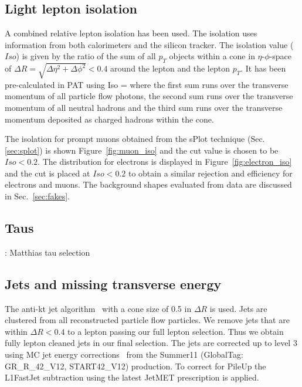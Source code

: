 \subsection{Light lepton isolation}\label{sec:isolation}

A combined relative lepton isolation has been used. The isolation uses information from both calorimeters and the silicon tracker. The isolation value ($Iso$) is given by the ratio of the sum of all $p_T$ objects within a cone in $\eta$-$\phi$-space of $\Delta R = \sqrt{\Delta \eta^2 + \Delta \phi^2 } < 0.4$ around the lepton and the lepton $p_T$. It has been pre-calculated in PAT using
\be
    Iso = 
\ee
where the first sum runs over the transverse momentum of all particle flow photons, the second sum runs over the transverse momentum of all neutral hadrons and the third sum runs over the transverse momentum deposited as charged hadrons within the cone.


The isolation for prompt muons obtained from the sPlot technique (Sec.\ref{sec:splot}) is shown Figure~\ref{fig:muon_iso} and the cut value is chosen to be $Iso<0.2$. The distribution for electrons is displayed in Figure~\ref{fig:electron_iso} and the cut is placed at $Iso<0.2$ to obtain a similar rejection and efficiency for electrons and muons. The background shapes evaluated from data are discussed in Sec.~\ref{sec:fakes}.

\subsection{Taus}\label{sec:taus}

\TODO: Matthias tau selection

\subsection{Jets and missing transverse energy}\label{sec:jet}

The anti-kt jet algorithm~\cite{antiKT} with a cone size of 0.5 in $\Delta R$ is used. 
Jets are clustered from all reconstructed particle flow particles.
We remove jets that are within $\Delta R < 0.4$ to a lepton passing our
full lepton selection. Thus we obtain fully lepton cleaned jets in our final selection.
The jets are corrected up to level 3 using MC jet energy corrections~\cite{mcjetcorrections}
from the Summer11 (GlobalTag: GR\_R\_42\_V12, START42\_V12) production. 
To correct for PileUp the L1FastJet subtraction using the latest JetMET
prescription is applied.

